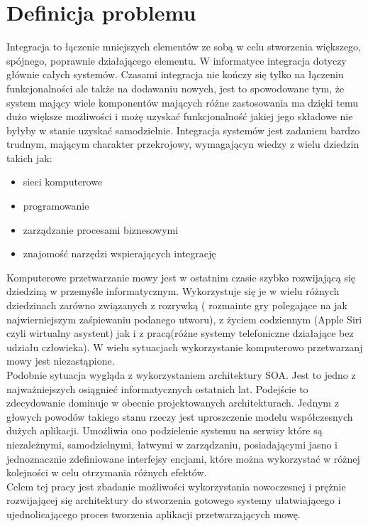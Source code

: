 \section{Definicja problemu } %
Integracja to łączenie mniejszych elementów ze sobą w celu stworzenia większego, spójnego, poprawnie działającego elementu. W informatyce integracja dotyczy głównie całych systemów. Czasami integracja nie kończy się tylko na łączeniu funkcjonalności ale także na dodawaniu nowych, jest to spowodowane tym, że system mający wiele komponentów mających różne zastosowania ma dzięki temu dużo większe możliwości i możę uzyskać funkcjonalność jakiej jego składowe nie byłyby w stanie uzyskać samodzielnie. Integracja systemów jest zadaniem bardzo trudnym, mającym charakter przekrojowy, wymagającyn wiedzy z wielu dziedzin takich jak:
 \begin{itemize}
	\item sieci komputerowe
	\item programowanie
	\item zarządzanie procesami biznesowymi
	\item znajomość narzędzi wspierających integrację
\end{itemize} 
Komputerowe przetwarzanie mowy jest w ostatnim czasie szybko rozwijającą się dziedziną w przemyśle informatycznym. Wykorzystuje się je w wielu różnych dziedzinach zarówno związanych z rozrywką ( rozmainte gry polegające na jak najwierniejszym zaśpiewaniu podanego utworu), z życiem codziennym (Apple Siri czyli wirtualny asystent) jak i z pracą(różne systemy telefoniczne działające bez udziału człowieka). W wielu sytuacjach wykorzystanie komputerowo przetwarzanj mowy jest niezastąpione.\\
Podobnie sytuacja wygląda z wykorzystaniem architektury SOA. Jest to jedno z najważniejszych osiągnieć informatycznych ostatnich lat. Podejście to zdecydowanie dominuje w obecnie projektowanych architekturach. Jednym z głowych powodów takiego stanu rzeczy jest uproszczenie modelu współczesnych dużych aplikacji. Umożliwia ono podzielenie systemu na serwisy które są niezależnymi, samodzielnymi, łatwymi w zarządzaniu, posiadającymi jasno i jednoznacznie zdefiniowane interfejsy encjami, które można wykorzystać w różnej kolejności w celu otrzymania różnych efektów. \\
Celem tej pracy jest zbadanie możliwości wykorzystania nowoczesnej i prężnie rozwijającej się architektury do stworzenia gotowego systemy ułatwiającego i ujednolicającego proces tworzenia aplikacji przetwarzających mowę.
 


